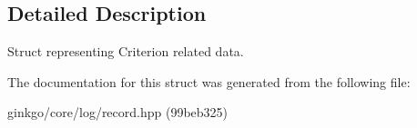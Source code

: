 \subsection{Detailed Description}
Struct representing Criterion related data. 

The documentation for this struct was generated from the following file\+:\begin{DoxyCompactItemize}
\item 
ginkgo/core/log/record.\+hpp (99beb325)\end{DoxyCompactItemize}

